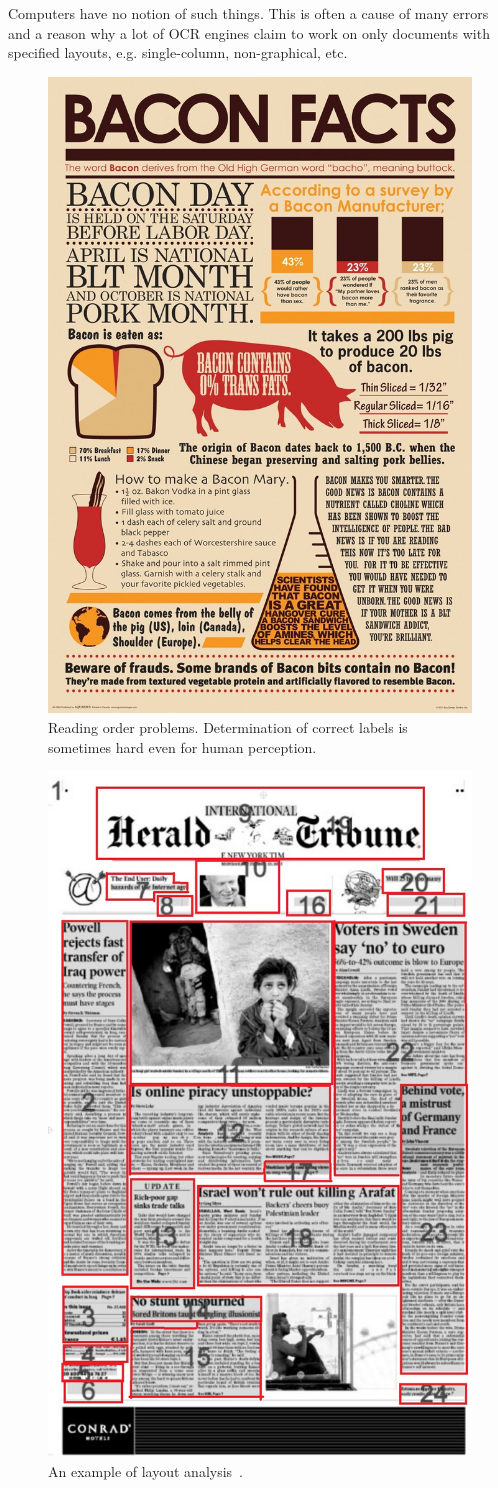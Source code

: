 Computers have no notion of such things. This is often a cause of many errors and a reason why a lot of OCR engines claim to work on only documents with specified layouts, e.g. single-column, non-graphical, etc.

\begin{figure}[t]
\centering
\includegraphics[width=0.5\linewidth]{img/tableDetection/readingOrderIssue.jpg}
\caption{Reading order problems. Determination of correct labels is sometimes hard even for human perception.} \label{fig:readingOrderProblems}
\end{figure}

\begin{figure}[t]
\centering
\includegraphics[width=0.5\linewidth]{img/tableDetection/readingOrder.jpg}
\caption{An example of layout analysis~\citep{hadjar2004xed}.}
\label{fig:readingOrderExample}
\end{figure}

